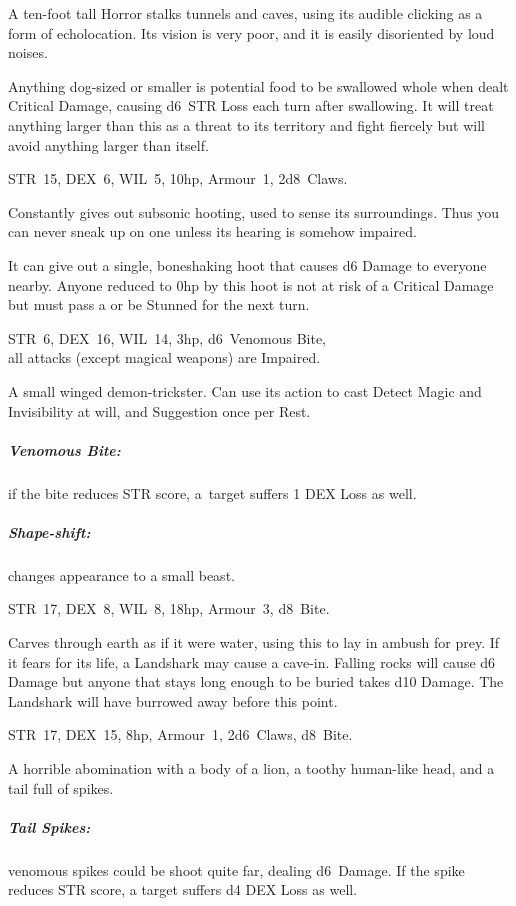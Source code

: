 \documentclass[itdr]{subfiles}
\begin{document}
A ten-foot tall Horror stalks tunnels and caves, using its audible clicking as a form of echolocation. Its vision is very poor, and it is easily disoriented by loud noises.

Anything dog-sized or smaller is potential food to be swallowed whole when dealt Critical Damage, causing d6~STR Loss each turn after swallowing. It will treat anything larger than this as a threat to its territory and fight fiercely but will avoid anything larger than itself.

\vfill

STR~15, DEX~6, WIL~5, 10hp, Armour~1, 2d8~Claws.

Constantly gives out subsonic hooting, used to sense its surroundings. Thus you can never sneak up on one unless its hearing is somehow impaired.

It can give out a single, boneshaking hoot that causes d6 Damage to everyone nearby. Anyone reduced to 0hp by this hoot is not at risk of a Critical Damage but must pass a  or be Stunned for the next turn.

\vfill

STR~6, DEX~16, WIL~14, 3hp, d6~Venomous Bite,\\all attacks (except magical weapons) are Impaired.

A small winged demon-trickster. Can use its action to cast Detect Magic and Invisibility at will, and Suggestion once per Rest.

\subparagraph{Venomous Bite:} if the bite reduces STR score, \mbox{a target} suffers 1 DEX Loss as well.

\subparagraph{Shape-shift:} changes appearance to a small beast.

\break

STR~17, DEX~8, WIL~8, 18hp, Armour~3, d8~Bite.

Carves through earth as if it were water, using this to lay in ambush for prey. If it fears for its life, a Landshark may cause a cave-in. Falling rocks will cause d6 Damage but anyone that stays long enough to be buried takes d10 Damage. The Landshark will have burrowed away before this point.

\vfill

STR~17, DEX~15, 8hp, Armour~1, 2d6~Claws, d8~Bite.

A horrible abomination with a body of a lion, a toothy human-like head, and a tail full of spikes.

\subparagraph{Tail Spikes:} venomous spikes could be shoot quite far, dealing d6~Damage. If the spike reduces STR score, a target suffers d4 DEX Loss as well.
\end{document}
